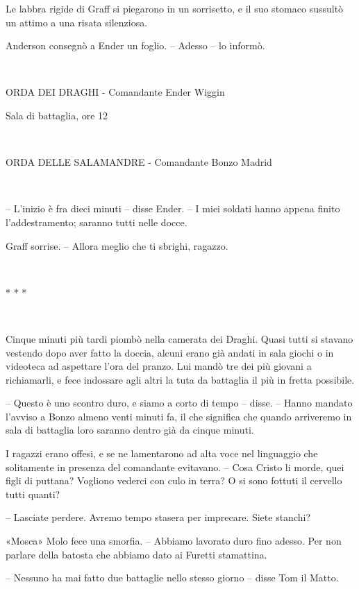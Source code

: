 {Le labbra rigide di Graff si piegarono in un sorrisetto, e il suo
	stomaco sussultò un attimo a una risata silenziosa.}

{Anderson consegnò a Ender un foglio. -- Adesso -- lo informò.}

{~}

\begin{center}
	{ORDA DEI DRAGHI - Comandante Ender Wiggin}

{Sala di battaglia, ore 12}

{~}

{ORDA DELLE SALAMANDRE - Comandante Bonzo Madrid}
\end{center}

{~}

{-- L'inizio è fra dieci minuti -- disse Ender. -- I miei soldati hanno
	appena finito l'addestramento; saranno tutti nelle docce.}

{Graff sorrise. -- Allora meglio che ti sbrighi, ragazzo.}

{~}

\begin{center}
	{* * *}
\end{center}

{~}

{Cinque minuti più tardi piombò nella camerata dei Draghi. Quasi tutti
	si stavano vestendo dopo aver fatto la doccia, alcuni erano già andati
	in sala giochi o in videoteca ad aspettare l'ora del pranzo. Lui mandò
	tre dei più giovani a richiamarli, e fece indossare agli altri la tuta
	da battaglia il più in fretta possibile.}

{-- Questo è uno scontro duro, e siamo a corto di tempo -- disse. --
	Hanno mandato l'avviso a Bonzo almeno venti minuti fa, il che significa
	che quando arriveremo in sala di battaglia loro saranno dentro già da
	cinque minuti.}

{I ragazzi erano offesi, e se ne lamentarono ad alta voce nel linguaggio
	che solitamente in presenza del comandante evitavano. -- Cosa Cristo li
	morde, quei figli di puttana? Vogliono vederci con culo in terra? O si
	sono fottuti il cervello tutti quanti?}

{-- Lasciate perdere. Avremo tempo stasera per imprecare. Siete
	stanchi?}

{«Mosca» Molo fece una smorfia. -- Abbiamo lavorato duro fino adesso.
	Per non parlare della batosta che abbiamo dato ai Furetti stamattina.}

{-- Nessuno ha mai fatto due battaglie nello stesso giorno -- disse Tom
	il Matto.}

